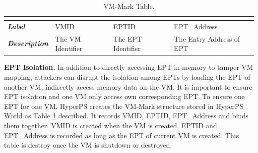 ﻿\documentclass[conference]{IEEEtran}
\begin{document}
\begin{table}[htbp]
\centering
\caption{VM-Mark Table.}\label{tab1}
\begin{tabular}{p{1.4cm}|p{1.2cm}|p{1.1cm}|p{1.7cm}}
\hline
\multicolumn{4}{c}{\bfseries\textbf\centering{VM-Mark Table}}\\
\hline
{\itshape\bfseries Label} & VMID & EPTID & EPT\_Address\\
\hline
{\itshape\bfseries Description} & { The VM Identifier} & The EPT Identifier & The Entry Address of EPT\\
\hline
\end{tabular}
\end{table}



\textbf{EPT Isolation.}
In addition to directly accessing EPT in memory to tamper VM mapping, attackers can disrupt the isolation among EPTs by loading the EPT of another VM, indirectly access memory data on the VM.
 It is important to ensure EPT isolation and one VM only access own corresponding EPT.
To ensure one EPT for one VM, HyperPS creates the VM-Mark structure stored in HyperPS World as Table \ref{tab1} described. It records VMID, EPTID, EPT\_Address and binds them together. VMID is created when the VM is created. 
 EPTID and EPT\_Address is recorded as long as the EPT of current VM is created. This table is destroy once the  VM is shutdown or destroyed.
\end{document}
